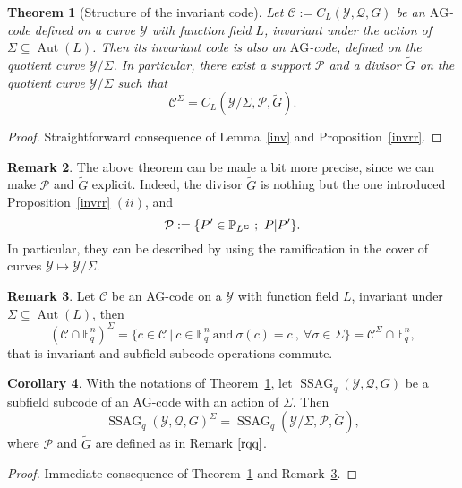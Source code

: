 \documentclass[10pt]{article}
\newtheorem{thm}{Theorem}
\theoremstyle{definition}
\newtheorem{coro1}[thm]{Corollary}
\theoremstyle{definition}
\newtheorem{rq1}[thm]{Remark}
\theoremstyle{definition}
\newcommand{\s}{\vspace{0.3cm}}
\newcommand{\PP}{\mathbb{P}}
\newcommand{\fq}{\mathbb{F}_q}
\newcommand{\su}{\subseteq}
\newcommand{\Y}{\mathcal{Y}}
\newcommand{\PR}{\mathcal{P}}
\newcommand{\QR}{\mathcal{Q}}
\newcommand{\Aut}{\operatorname{Aut}}
\newcommand{\ssag}{\operatorname{SSAG}}
\begin{document}
\begin{thm} [Structure of the invariant code] \label{invstruct}
Let $\mathcal{C} := C_L(\Y,\QR,G)$ be an $\mathrm{AG}$-code defined on a curve $\Y$ with function field $L$, invariant under the action of $\Sigma \su \Aut(L)$. Then its invariant code is also an $\mathrm{AG}$-code, defined on the quotient curve $\Y/\Sigma$. In particular, there exist a support $\PR$ and a divisor $\tilde{G}$ on the quotient curve $\Y/\Sigma$ such that
\[\mathcal{C}^{\Sigma} = C_L(\Y/\Sigma,\PR,\tilde{G}).\]
\end{thm}

\s
 
\begin{proof}
Straightforward consequence of Lemma~\ref{inv} and Proposition~\ref{invrr}.
\end{proof}

\s


\begin{rq1} \label{rqq}
The above theorem can be made a bit more precise, since we can make $\PR$ and $\tilde{G}$ explicit. Indeed, the divisor $\tilde{G}$ is nothing but the one introduced  Proposition~\ref{invrr} $(ii)$, and \[\PR := \\ \{P' \in \PP_{L^{\Sigma}} \ ; \ P|P'\}.\] In particular, they can be described by using the ramification in the cover of curves $\Y \longmapsto \Y/\Sigma$.
\end{rq1}

\s

\begin{rq1} \label{commute}
Let $\mathcal{C}$ be an AG-code on a $\Y$ with function field $L$, invariant under $\Sigma \su \Aut(L)$, then
\[(\mathcal{C}\cap \fq^n)^{\Sigma} = \{c \in \mathcal{C} \ | \ c \in \fq^n \ \textrm{and} \ \sigma(c)=c \ , \ \forall \sigma \in \Sigma\} = \mathcal{C}^{\Sigma} \cap \fq^n,\]
that is invariant and subfield subcode operations commute.
\end{rq1}

\s

\begin{coro1} \label{ssag}
With the notations of Theorem~\ref{invstruct}, let $\ssag_q(\Y,\QR,G)$ be a subfield subcode of an AG-code with an action of $\Sigma$. Then 
\[\ssag_q(\Y,\QR,G)^{\Sigma} = \ssag_q(\Y/\Sigma,\PR,\tilde{G}),\]
where $\PR$ and $\tilde{G}$ are defined as in Remark $\ref{rqq}$.
\end{coro1}

\s

\begin{proof}
Immediate consequence of Theorem~\ref{invstruct} and Remark~\ref{commute}.
\end{proof}
\end{document}

